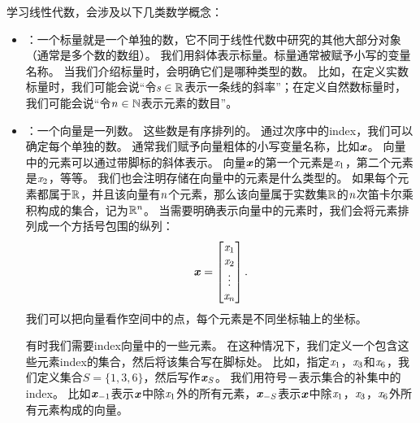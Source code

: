 学习线性代数，会涉及以下几类数学概念：
\begin{itemize}
    \item {}：一个标量就是一个单独的数，它不同于线性代数中研究的其他大部分对象（通常是多个数的数组）。
    我们用斜体表示标量。标量通常被赋予小写的变量名称。
    当我们介绍标量时，会明确它们是哪种类型的数。
    比如，在定义实数标量时，我们可能会说``令$\mathit{s} \in \mathbb{R}$表示一条线的斜率''；在定义自然数标量时，我们可能会说``令$\mathit{n}\in\mathbb{N}$表示元素的数目''。


    \item {}：一个向量是一列数。
    这些数是有序排列的。
    通过次序中的\gls{index}，我们可以确定每个单独的数。
    通常我们赋予向量粗体的小写变量名称，比如$\boldsymbol{\mathit{x}}$。
    向量中的元素可以通过带脚标的斜体表示。
    向量$\boldsymbol{\mathit{x}}$的第一个元素是$\mathit{x}_1$，第二个元素是$\mathit{x}_2$，等等。
    我们也会注明存储在向量中的元素是什么类型的。
    如果每个元素都属于$\mathbb{R}$，并且该向量有$\mathit{n}$个元素，那么该向量属于实数集$\mathbb{R}$的$\mathit{n}$次笛卡尔乘积构成的集合，记为$\mathbb{R}^n$。
    当需要明确表示向量中的元素时，我们会将元素排列成一个方括号包围的纵列：
    \begin{equation}
        \boldsymbol{\mathit{x}}=\begin{bmatrix} \mathit{x}_1   \\  
                            \mathit{x}_2   \\ 
                            \vdots  \\ 
                            \mathit{x}_n 
                \end{bmatrix}.
    \end{equation}
    我们可以把向量看作空间中的点，每个元素是不同坐标轴上的坐标。
    
    有时我们需要\gls{index}向量中的一些元素。
    在这种情况下，我们定义一个包含这些元素\gls{index}的集合，然后将该集合写在脚标处。
    比如，指定$\mathit{x}_1$，$\mathit{x}_3$和$\mathit{x}_6$，我们定义集合$S=\{1,3,6\}$，然后写作$\boldsymbol{\mathit{x}}_S$。
    我们用符号－表示集合的补集中的\gls{index}。
    比如$\boldsymbol{\mathit{x}}_{-1}$表示$\boldsymbol{\mathit{x}}$中除$\mathit{x}_1$外的所有元素，$\boldsymbol{\mathit{x}}_{-S}$表示$\boldsymbol{\mathit{x}}$中除$\mathit{x}_1$，$\mathit{x}_3$，$\mathit{x}_6$外所有元素构成的向量。


\end{itemize}
